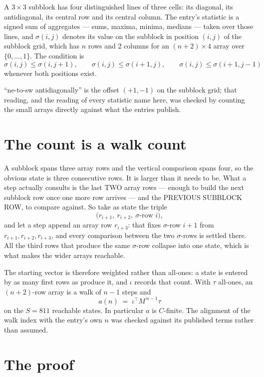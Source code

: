 \documentclass[11pt,a4paper]{article}
\theoremstyle{plain}
\theoremstyle{definition}
\begin{document}
A $3\times3$ subblock has four distinguished lines of three cells: its diagonal, its
antidiagonal, its central row and its central column. The entry's statistic is a signed sum of
aggregates --- sums, maxima, minima, medians --- taken over those lines, and $\sigma(i,j)$
denotes its value on the subblock in position $(i,j)$ of the subblock grid, which has $n$ rows
and $2$ columns for an $(n+2)\times4$ array over $\{0,\dots,1\}$. The condition is
\[
\sigma(i,j)\le\sigma(i,j+1),\qquad \sigma(i,j)\le\sigma(i+1,j),\qquad \sigma(i,j)\le\sigma(i+1,j-1)
\]
whenever both positions exist.

``ne-to-sw antidiagonally'' is the offset $(+1,-1)$ on the subblock grid; that reading, and
the reading of every statistic name here, was checked by counting the small arrays directly
against what the entries publish.

\section{The count is a walk count}

A subblock spans three array rows and the vertical comparison spans four, so the obvious state
is three consecutive rows. It is larger than it needs to be. What a step actually consults is
the last TWO array rows --- enough to build the next subblock row once one more row arrives ---
and the PREVIOUS SUBBLOCK ROW, to compare against. So take as state the triple
\[
\bigl(r_{i+1},\ r_{i+2},\ \sigma\text{-row }i\bigr),
\]
and let a step append an array row $r_{i+3}$: that fixes $\sigma$-row $i+1$ from
$r_{i+1},r_{i+2},r_{i+3}$, and every comparison between the two $\sigma$-rows is settled
there. All the third rows that produce the same $\sigma$-row collapse into one state, which is
what makes the wider arrays reachable.

The starting vector is therefore weighted rather than all-ones: a state is entered by as many
first rows as produce it, and $\iota$ records that count. With $\tau$ all-ones, an
$(n+2)$-row array is a walk of $n-1$ steps and
\[
a(n)\;=\;\iota^{\!\top}M^{\,n-1}\tau
\]
on the $S=811$ reachable states. In particular $a$ is $C$-finite. The alignment of the walk
index with the entry's own $n$ was checked against its published terms rather than assumed.

\section{The proof}
\end{document}
